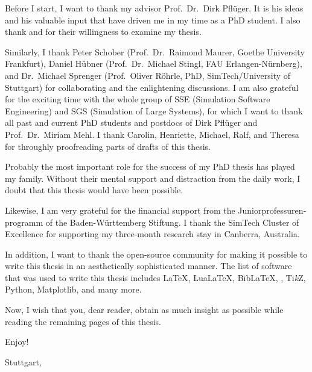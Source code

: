 
Before I start, I want to thank my advisor Prof.\ Dr.\ Dirk Pflüger.
It is his ideas and his valuable input that have driven me in
my time as a PhD student.
I also thank \theexamineri{} and \theexaminerii{}
for their willingness to examine my thesis.

Similarly, I thank
Peter Schober
(Prof.\ Dr.\ Raimond Maurer, Goethe University Frankfurt),
Daniel Hübner
(Prof.\ Dr.\ Michael Stingl, FAU Erlangen-Nürnberg), and
Dr.\ Michael Sprenger
(Prof.\ Oliver Röhrle, PhD, SimTech/University of Stuttgart) for
collaborating and the enlightening discussions.
I am also grateful for the exciting time with the whole group of
SSE (Simulation Software Engineering) and
SGS (Simulation of Large Systems),
for which I want to thank all past and current PhD students and postdocs of
Dirk Pflüger and Prof.\ Dr.\ Miriam Mehl.
I thank Carolin, Henriette, Michael, Ralf, and Theresa
for throughly proofreading parts of drafts of this thesis.

Probably the most important role for the success of my PhD thesis
has played my family.
Without their mental support and distraction from the daily work,
I doubt that this thesis would have been possible.

Likewise, I am very grateful for the financial support from
the \foreignlanguage{ngerman}{Juniorprofessurenprogramm} of the
\foreignlanguage{ngerman}{Baden-Württemberg Stiftung}.
I thank the SimTech Cluster of Excellence for supporting
my three-month research stay in Canberra, Australia.

In addition, I want to thank the open-source community for making it possible to
write this thesis in an aesthetically sophisticated manner.
The list of software that was used to write this thesis includes
\LaTeX, Lua\LaTeX, Bib\LaTeX,
\scalebox{0.9}{\KOMAScript}, Ti\emph{k}Z, Python, Matplotlib,
and many more.

\label{page:preface}
Now, I wish that you, dear reader, obtain as much insight as possible
while reading the remaining
 pages of this thesis.

Enjoy!

\vspace{1em}

\noindent
Stuttgart, \thedate

\noindent
\theauthor

\cleardoublepage
